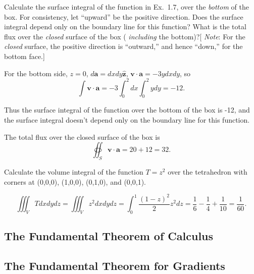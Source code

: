 \begin{prob}[1.30] Calculate the surface integral of the function in Ex.~1.7, over the \textit{bottom} of the box. For consistency, let ``upward'' be the positive direction. Does the surface integral depend only on the boundary line for this function? What is the total flux over the \textit{closed} surface of the box ( \textit{including} the bottom)?[ \textit{Note}: For the \textit{closed} surface, the positive direction is ``outward,'' and hence ``down,'' for the bottom face.]
\end{prob}

\begin{sol}[1.30] For the bottom side, $z = 0$, $d\mathbf{a} = dxdy\mathbf{\hat{z}}$, $\mathbf{v}\cdot\mathbf{a} = -3ydxdy$, so
    \begin{equation}
        \int\mathbf{v}\cdot\mathbf{a} = -3\int_0^2dx\int_0^2ydy = -12.
    \end{equation}

    Thus the surface integral of the function over the bottom of the box is -12, and the surface integral doesn't depend only on the boundary line for this function.

    The total flux over the closed surface of the box is
    \begin{equation}
        \oiint_S \mathbf{v}\cdot\mathbf{a} = 20 + 12 = 32.
    \end{equation}
\end{sol}

\begin{prob}[1.31] Calculate the volume integral of the function $T = z^2$ over the tetrahedron with corners at (0,0,0), (1,0,0), (0,1,0), and (0,0,1).
\end{prob}

\begin{sol}[1.31]
    \begin{equation}
        \iiint_V T dx dy dz = \iiint_V z^2 dx dy dz = \int_0^1\frac{(1-z)^2}{2}z^2dz = \frac{1}{6} - \frac{1}{4} + \frac{1}{10} = \frac{1}{60}.
    \end{equation}
\end{sol}

\subsection{The Fundamental Theorem of Calculus}
\subsection{The Fundamental Theorem for Gradients}

